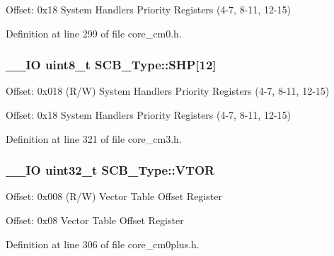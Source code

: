 Offset\-: 0x18 System Handlers Priority Registers (4-\/7, 8-\/11, 12-\/15) 

Definition at line 299 of file core\-\_\-cm0.\-h.

\hypertarget{struct_s_c_b___type_af6336103f8be0cab29de51daed5a65f4}{
\subsubsection[{S\-H\-P}]{\setlength{\rightskip}{0pt plus 5cm}\-\_\-\-\_\-\-I\-O {\bf uint8\-\_\-t} S\-C\-B\-\_\-\-Type\-::\-S\-H\-P\mbox{[}12\mbox{]}}}\label{struct_s_c_b___type_af6336103f8be0cab29de51daed5a65f4}
Offset\-: 0x018 (R/\-W) System Handlers Priority Registers (4-\/7, 8-\/11, 12-\/15)

Offset\-: 0x18 System Handlers Priority Registers (4-\/7, 8-\/11, 12-\/15) 

Definition at line 321 of file core\-\_\-cm3.\-h.

\hypertarget{struct_s_c_b___type_a0faf96f964931cadfb71cfa54e051f6f}{
\subsubsection[{V\-T\-O\-R}]{\setlength{\rightskip}{0pt plus 5cm}\-\_\-\-\_\-\-I\-O {\bf uint32\-\_\-t} S\-C\-B\-\_\-\-Type\-::\-V\-T\-O\-R}}\label{struct_s_c_b___type_a0faf96f964931cadfb71cfa54e051f6f}
Offset\-: 0x008 (R/\-W) Vector Table Offset Register

Offset\-: 0x08 Vector Table Offset Register 

Definition at line 306 of file core\-\_\-cm0plus.\-h.



